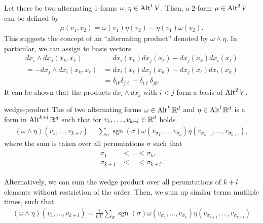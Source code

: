 \begin{example}
  Let there be two alternating 1-forms $\omega, \eta \in \operatorname{Alt}^1V$.
  Then, a 2-form $\mu \in \operatorname{Alt}^2V$ can be defined by
  \begin{gather}
    \mu(v_1, v_2) = \omega(v_1)\eta(v_2) - \eta(v_1)\omega(v_2).
  \end{gather}
  This suggests the concept of an ``alternating product'' denoted by $\omega \wedge \eta$. In
  particular, we can assign to basis vectors
  \begin{align}
    dx_i \wedge dx_j (x_k,x_\ell)
    &= dx_i(x_k)dx_j(x_\ell) - dx_j(x_k)dx_i(x_\ell) \\
    = - dx_j \wedge dx_i(x_k,x_\ell) &= dx_i(x_\ell)dx_j(x_k) - dx_j(x_\ell)dx_i(x_k) \\
    &= \delta_{ik}\delta_{j\ell} - \delta_{i\ell}\delta_{jk}.
  \end{align}
  It can be shown that the products $dx_i\wedge dx_j$ with $i<j$ form a basis of $\operatorname{Alt}^2V$.
\end{example}

\begin{Definition}{wedge-product}
  The  of two alternating forms
  $\omega\in \operatorname{Alt}^k\mathbb R^d$ and $\eta\in\operatorname{Alt}^l\mathbb R^d$ is a form in $\operatorname{Alt}^{k+l}\mathbb R^d$ such that for
  $v_1,\dots,v_{k+l}\in\mathbb R^d$ holds
  \begin{gather}
    (\omega\wedge\eta)(v_1,\dots,v_{k+l})
    = \sum_{\sigma} \operatorname{sgn}(\sigma) \omega(v_{\sigma_1},\dots,v_{\sigma_k})
    \eta(v_{\sigma_{k+1}},\dots,v_{\sigma_{k+l}}),
  \end{gather}
  where the sum is taken over all permutations $\sigma$ such that
  \begin{gather}
    \begin{split}
      \sigma_1 &< \dots < \sigma_k,\\
      \sigma_{k+1} & < \dots < \sigma_{k+l}.
    \end{split}
  \end{gather}
\end{Definition}

\begin{remark}
  Alternatively, we can sum the wedge product over all perumtations of $k+l$ elements
  without restriction of the order. Then, we sum up similar terms
  mutliple times, such that
  \begin{gather}
    (\omega\wedge\eta)(v_1,\dots,v_{k+l})
    = \frac1{k!l!}\sum_{\sigma} \operatorname{sgn}(\sigma) \omega(v_{\sigma_1},\dots,v_{\sigma_k})
    \eta(v_{\sigma_{k+1}},\dots,v_{\sigma_{k+l}})
  \end{gather}
\end{remark}

